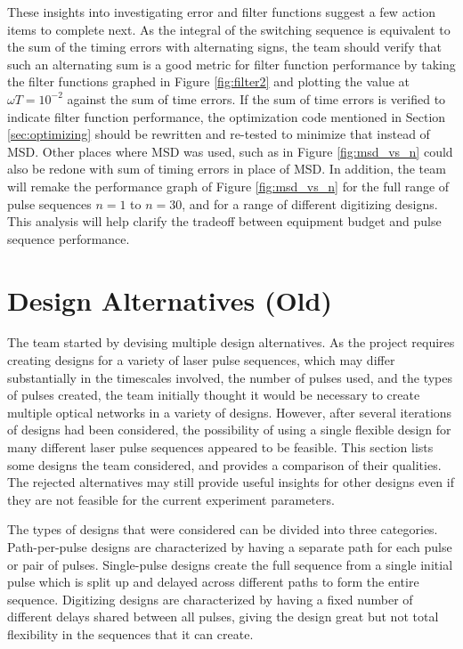 \documentclass[pdftex,12pt,a4paper]{article}
\begin{document}
These insights into investigating error and filter functions suggest a few action items to complete next. As the integral of the switching sequence is equivalent to the sum of the timing errors with alternating signs, the team should verify that such an alternating sum is a good metric for filter function performance by taking the filter functions graphed in Figure \ref{fig:filter2} and plotting the value at $\omega T = 10^{-2}$ against the sum of time errors. If the sum of time errors is verified to indicate filter function performance, the optimization code mentioned in Section \ref{sec:optimizing} should be rewritten and re-tested to minimize that instead of MSD. Other places where MSD was used, such as in Figure \ref{fig:msd_vs_n} could also be redone with sum of timing errors in place of MSD. In addition, the team will remake the performance graph of Figure \ref{fig:msd_vs_n} for the full range of pulse sequences $n=1$ to $n=30$, and for a range of different digitizing designs.  This analysis will help clarify the tradeoff between equipment budget and pulse sequence performance.

\section{Design Alternatives (Old)}
\label{sec:design_alternatives}
The team started by devising multiple design alternatives. As the project requires creating designs for a variety of laser pulse sequences, which may differ substantially in the timescales involved, the number of pulses used, and the types of pulses created, the team initially thought it would be necessary to create multiple optical networks in a variety of designs. However, after several iterations of designs had been considered, the possibility of using a single flexible design for many different laser pulse sequences appeared to be feasible. This section lists some designs the team considered, and provides a comparison of their qualities. The rejected alternatives may still provide useful insights for other designs even if they are not feasible for the current experiment parameters.

	The types of designs that were considered can be divided into three categories.  Path-per-pulse designs are characterized by having a separate path for each pulse or pair of pulses. Single-pulse designs create the full sequence from a single initial pulse which is split up and delayed across different paths to form the entire sequence. Digitizing designs are characterized by having a fixed number of different delays shared between all pulses, giving the design great but not total flexibility in the sequences that it can create.
    
\end{document}
